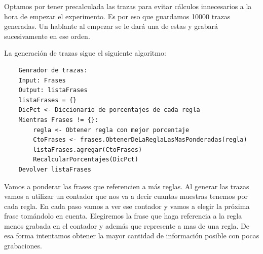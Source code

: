 \documentclass[11pt,a4paper,twoside]{tesis}
\begin{document}
Optamos por tener precalculada las trazas para evitar cálculos innecesarios a la hora de empezar el experimento. Es por eso que guardamos 10000 trazas generadas. Un hablante al empezar se le dará una de estas y grabará sucesivamente en ese orden.

La generación de trazas sigue el siguiente algoritmo:

\begin{lstlisting}
    Genrador de trazas:
    Input: Frases
    Output: listaFrases 
    listaFrases = {}
    DicPct <- Diccionario de porcentajes de cada regla
    Mientras Frases != {}:
    	regla <- Obtener regla con mejor porcentaje
    	CtoFrases <- frases.ObtenerDeLaReglaLasMasPonderadas(regla)
    	listaFrases.agregar(CtoFrases)
    	RecalcularPorcentajes(DicPct)
    Devolver listaFrases
\end{lstlisting}

Vamos a ponderar las frases que referencien a más reglas. Al generar las trazas vamos a utilizar un contador que nos va a decir cuantas muestras tenemos por cada regla. En cada paso vamos a ver ese contador y vamos a elegir la próxima frase tomándolo en cuenta. Elegiremos la frase que haga referencia a la regla menos grabada en el contador y además que represente a mas de una regla. De esa forma intentamos obtener la mayor cantidad de información posible con pocas grabaciones.
\end{document}
